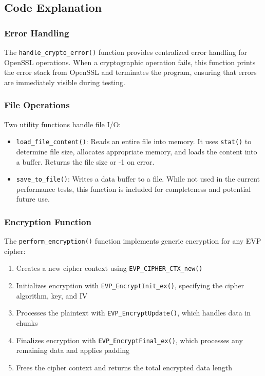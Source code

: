 \documentclass[12pt,a4paper]{article}
\begin{document}


\subsection{Code Explanation}

\subsubsection{Error Handling}
The \texttt{handle\_crypto\_error()} function provides centralized error handling for OpenSSL operations. When a cryptographic operation fails, this function prints the error stack from OpenSSL and terminates the program, ensuring that errors are immediately visible during testing.

\subsubsection{File Operations}
Two utility functions handle file I/O:
\begin{itemize}
    \item \texttt{load\_file\_content()}: Reads an entire file into memory. It uses \texttt{stat()} to determine file size, allocates appropriate memory, and loads the content into a buffer. Returns the file size or -1 on error.
    \item \texttt{save\_to\_file()}: Writes a data buffer to a file. While not used in the current performance tests, this function is included for completeness and potential future use.
\end{itemize}

\subsubsection{Encryption Function}
The \texttt{perform\_encryption()} function implements generic encryption for any EVP cipher:
\begin{enumerate}
    \item Creates a new cipher context using \texttt{EVP\_CIPHER\_CTX\_new()}
    \item Initializes encryption with \texttt{EVP\_EncryptInit\_ex()}, specifying the cipher algorithm, key, and IV
    \item Processes the plaintext with \texttt{EVP\_EncryptUpdate()}, which handles data in chunks
    \item Finalizes encryption with \texttt{EVP\_EncryptFinal\_ex()}, which processes any remaining data and applies padding
    \item Frees the cipher context and returns the total encrypted data length
\end{enumerate}
\end{document}
